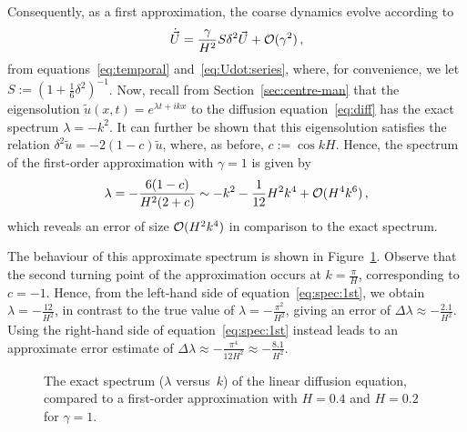 \documentclass[12pt,a5paper]{article}
\begin{document}
Consequently, as a first approximation, the coarse dynamics evolve according to
\begin{eqnarray}
	\dot{\vec U} = \frac{\gamma}{H^2}S\delta^2\vec U + {\cal O}(\gamma^2)\,,
\label{eq:Udot:1}
\end{eqnarray}
from equations~\eqref{eq:temporal} and~\eqref{eq:Udot:series},
where, for convenience, we let $S:=(1+\frac{1}{6}\delta^2)^{-1}$.
Now, recall from Section~\ref{sec:centre-man} that the eigensolution $\tilde{u}(x,t)=e^{\lambda t+ikx}$ %
to the diffusion equation~\eqref{eq:diff} has the exact spectrum $\lambda=-k^2$.
It can further be shown that this eigensolution  satisfies the relation 
$\delta^2\tilde{u}=-2(1-c)\tilde{u}$, where, as before, $c:=\cos kH$. Hence, the spectrum of the first-order approximation with $\gamma=1$ is
given by
\begin{eqnarray}
\lambda = -\frac{6(1-c)}{H^2(2+c)} \sim -k^2-\frac{1}{12}H^2k^4+{\cal O}(H^4k^6)\,,
\label{eq:spec:1st}
\end{eqnarray}
which reveals an error of size ${\cal O}(H^2k^4)$ in comparison to the exact spectrum.

The behaviour of this approximate spectrum is shown in Figure~\ref{fig:spec:first-order}.
Observe that the second turning point of the approximation occurs at $k=\frac{\pi}{H}$, corresponding to $c=-1$.
Hence, from the left-hand side of equation~\eqref{eq:spec:1st}, we obtain $\lambda=-\frac{12}{H^2}$, in contrast to the true value of
$\lambda=-\frac{\pi^2}{H^2}$, giving an error of $\Delta\lambda\approx-\frac{2.1}{H^2}$.
Using the right-hand side of  equation~\eqref{eq:spec:1st} instead leads to an approximate error estimate of
$\Delta\lambda\approx-\frac{\pi^4}{12H^2}\approx-\frac{8.1}{H^2}$.
\begin{figure}[hbt]
\centering
{}
\caption{The exact spectrum ($\lambda$ versus~$k$) of the linear diffusion equation, compared to a first-order approximation with $H=0.4$ and $H=0.2$ for $\gamma=1$.}
\label{fig:spec:first-order}
\end{figure}
\end{document}
